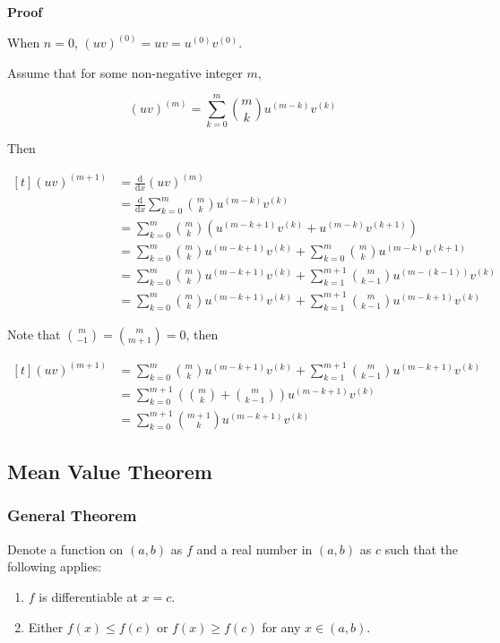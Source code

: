 \documentclass[a4paper,12pt]{article}
\newcommand{\s}{\vspace{1mm}}
\newcommand{\n}{\vspace{3mm}}
\newcommand{\diff}{\mathrm{d}}
\newenvironment{block}[4][Block]{ %
\begin{list}{}{
  \setlength{\leftmargin}{0mm}
  \setlength{\rightmargin}{0mm}
  \setlength{\topsep}{0mm}
  \setlength{\partopsep}{0mm}
  \parsep\parskip
  \setlength{\itemsep}{-\parsep}
  }
  \needspace{\baselineskip}
  \item \textbf{#2 #3} \hspace{1mm} #4
  \vspace{1mm}
  \item
  }
{
\end{list}
}
\newenvironment{alist}{ %
\begin{enumerate}[label=(\alph*)]
}{
\end{enumerate}
}
\begin{document}
\begin{block}{Proof}{}{}
  When $n=0$, $(uv)^{(0)}=uv=u^{(0)}v^{(0)}$.\n

  Assume that for some non-negative integer $m$,

  $$(uv)^{(m)}=\sum_{k=0}^{m}\binom{m}{k}u^{(m-k)}v^{(k)}$$\s

  Then

  $$\begin{aligned}[t]
    (uv)^{(m+1)}&=\frac{\diff }{\diff  x}(uv)^{(m)}\\
    &=\frac{\diff }{\diff  x}\sum_{k=0}^{m}\binom{m}{k}u^{(m-k)}v^{(k)}\\
    &=\sum_{k=0}^{m}\binom{m}{k}(u^{(m-k+1)}v^{(k)}+u^{(m-k)}v^{(k+1)})\\
    &=\sum_{k=0}^{m}\binom{m}{k}u^{(m-k+1)}v^{(k)}+\sum_{k=0}^{m}\binom{m}{k}u^{(m-k)}v^{(k+1)}\\
    &=\sum_{k=0}^{m}\binom{m}{k}u^{(m-k+1)}v^{(k)}+\sum_{k=1}^{m+1}\binom{m}{k-1}u^{(m-(k-1))}v^{(k)}\\
    &=\sum_{k=0}^{m}\binom{m}{k}u^{(m-k+1)}v^{(k)}+\sum_{k=1}^{m+1}\binom{m}{k-1}u^{(m-k+1)}v^{(k)}
  \end{aligned}$$\s

  Note that $\binom{m}{-1}=\binom{m}{m+1}=0$, then

  $$\begin{aligned}[t]
    (uv)^{(m+1)}&=\sum_{k=0}^{m}\binom{m}{k}u^{(m-k+1)}v^{(k)}+\sum_{k=1}^{m+1}\binom{m}{k-1}u^{(m-k+1)}v^{(k)}\\
    &=\sum_{k=0}^{m+1}\left( \binom{m}{k}+\binom{m}{k-1}\right) u^{(m-k+1)}v^{(k)}\\
    &=\sum_{k=0}^{m+1}\binom{m+1}{k}u^{(m-k+1)}v^{(k)}
  \end{aligned}$$\s
\end{block}

\subsection{Mean Value Theorem}
\subsubsection{General Theorem}
Denote a function on $(a,b)$ as $f$ and a real number in $(a,b)$ as $c$ such that the following applies:

\begin{alist}
  \item $f$ is differentiable at $x=c$.
  \item Either $f(x)\leq f(c)$ or $f(x)\geq f(c)$ for any $x\in (a,b)$.
\end{alist}
\end{document}
